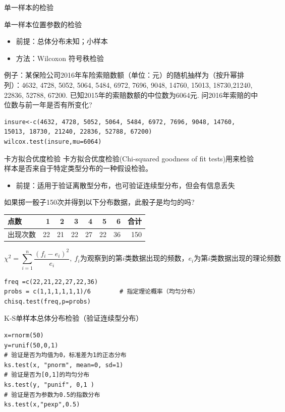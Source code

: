 \documentclass[presentation]{beamer}
\begin{document}
\begin{frame}[fragile,label={sec:orgeeaaa18}]{单一样本的检验}
 \begin{block}{单一样本位置参数的检验}
\begin{itemize}
\item 前提：总体分布未知；小样本
\item 方法：Wilcoxon 符号秩检验
\end{itemize}

例子：某保险公司2016年车险索赔数额（单位：元）的随机抽样为（按升幂排列）：4632, 4728, 5052, 5064, 5484, 6972, 7696, 9048, 14760, 15013, 18730,21240, 22836, 52788, 67200. 已知2015年的索赔数额的中位数为6064元. 问2016年索赔的中位数与前一年是否有所变化?
\begin{verbatim}
insure<-c(4632, 4728, 5052, 5064, 5484, 6972, 7696, 9048, 14760, 15013, 18730, 21240, 22836, 52788, 67200)
wilcox.test(insure,mu=6064)
\end{verbatim}
\end{block}

\begin{block}{卡方拟合优度检验}
卡方拟合优度检验(Chi-squared goodness of fit tests)用来检验样本是否来自于特定类型分布的一种假设检验。  
\begin{itemize}
\item 前提：适用于验证离散型分布，也可验证连续型分布，但会有信息丢失
\end{itemize}
如果掷一骰子150次并得到以下分布数据，此骰子是均匀的吗?   

\begin{center}
\begin{tabular}{lrrrrrrr}
点数 & 1 & 2 & 3 & 4 & 5 & 6 & 合计\\
\hline
出现次数 & 22 & 21 & 22 & 27 & 22 & 36 & 150\\
\end{tabular}
\end{center}

$$\chi^2=\sum_{i=1}^n \frac{(f_i-e_i)^2}{e_i},\ f_i为观察到的第i类数据出现的频数，e_i为第i类数据出现的理论频数$$
\begin{verbatim}
freq =c(22,21,22,27,22,36)
probs = c(1,1,1,1,1,1)/6        # 指定理论概率（均匀分布）
chisq.test(freq,p=probs)
\end{verbatim}
\end{block}
\begin{block}{K-S单样本总体分布检验（验证连续型分布）}
\begin{verbatim}
x=rnorm(50)
y=runif(50,0,1)
# 验证是否为均值为0，标准差为1的正态分布
ks.test(x, "pnorm", mean=0, sd=1)
# 验证是否为[0,1]的均匀分布
ks.test(y, "punif", 0,1 )
# 验证是否为参数为0.5的指数分布
ks.test(x,"pexp",0.5)
\end{verbatim}
\end{block}
\end{frame}
\end{document}
